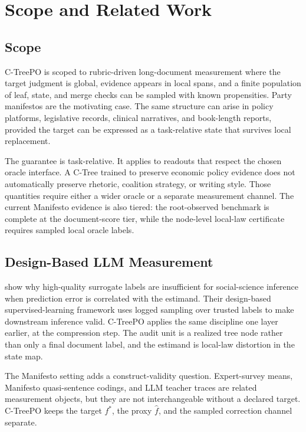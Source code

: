 \section{Scope and Related Work}\label{sec:v8-scope-related}

\subsection{Scope}

C-TreePO is scoped to rubric-driven long-document measurement where the target
judgment is global, evidence appears in local spans, and a finite population
of leaf, state, and merge checks can be sampled with known propensities. Party
manifestos are the motivating case. The same structure can arise in policy
platforms, legislative records, clinical narratives, and book-length reports,
provided the target can be expressed as a task-relative state that survives
local replacement.

The guarantee is task-relative. It applies to readouts that respect the chosen
oracle interface. A C-Tree trained to preserve economic policy evidence does
not automatically preserve rhetoric, coalition strategy, or writing style.
Those quantities require either a wider oracle or a separate measurement
channel. The current Manifesto evidence is also tiered: the root-observed
benchmark is complete at the document-score tier, while the node-level
local-law certificate requires sampled local oracle labels.

\subsection{Design-Based LLM Measurement}

\citet{EgamiEtAl2024} show why high-quality surrogate labels are insufficient
for social-science inference when prediction error is correlated with the
estimand. Their design-based supervised-learning framework uses logged
sampling over trusted labels to make downstream inference valid. C-TreePO
applies the same discipline one layer earlier, at the compression step. The
audit unit is a realized tree node rather than only a final document label,
and the estimand is local-law distortion in the state map.

The Manifesto setting adds a construct-validity question. Expert-survey means,
Manifesto quasi-sentence codings, and LLM teacher traces are related
measurement objects, but they are not interchangeable without a declared
target. C-TreePO keeps the target \(f^\ast\), the proxy \(\widehat f\), and
the sampled correction channel separate.

